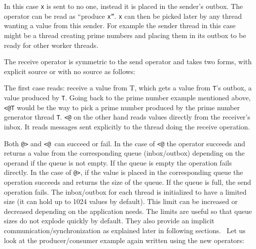 
In this case \texttt{x} is sent to no one, instead it is
placed in the sender{\textquoteright}s outbox. The operator can be read
as {\textquotedblleft}produce
\texttt{x{\textquotedblright}}. \texttt{x} can
then be picked later by any thread wanting a value from this sender.
For example the sender thread in this case might be a thread creating
prime numbers and placing them in its outbox to be ready for other
worker threads.

The receive operator is symmetric to the send operator and takes two
forms, with explicit source or with no source as follows:


The first case reads: receive a value from T, which gets a value from
\texttt{T}{\textquoteright}s outbox, a value produced by
\texttt{T}. Going back to the prime number example mentioned
above, \texttt{{\textless}@T} would be the way to pick a
prime number produced by the prime number generator thread
\texttt{T}. \texttt{{\textless}@} on the other
hand reads values directly from the receiver{\textquoteright}s inbox.
It reads messages sent explicitly to the thread doing the receive
operation.

Both \texttt{@{\textgreater}} and
\texttt{{\textless}@ }can succeed or fail. In the case
of \texttt{{\textless}@} the operator succeeds and
returns a value from the corresponding queue (inbox/outbox) depending
on the operand if the queue is not empty. If the queue is empty the
operation fails directly. In the case of
\texttt{@{\textgreater}}, if the value is placed in the
corresponding queue the operation succeeds and returns the size of the
queue. If the queue is full, the send operation fails. The inbox/outbox
for each thread is initialized to have a limited size (it can hold up
to 1024 values by default). This limit can be increased or decreased
depending on the application needs. The limits are useful so that queue
sizes do not explode quickly by default. They also provide an implicit
communication/synchronization as explained later in following sections.
\ Let us look at the producer/consumer example again written using the
new operators:

